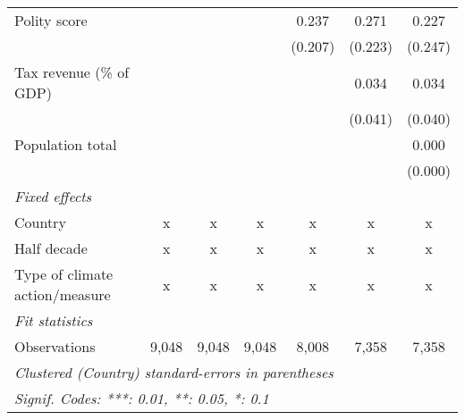 \begin{tabular}{lcccccc}
   Polity score                                                           &         &         &               & 0.237         & 0.271         & 0.227\\   
                                                                          &         &         &               & (0.207)       & (0.223)       & (0.247)\\   
   Tax revenue (\% of GDP)                                                &         &         &               &               & 0.034         & 0.034\\   
                                                                          &         &         &               &               & (0.041)       & (0.040)\\   
   Population total                                                       &         &         &               &               &               & 0.000\\   
                                                                          &         &         &               &               &               & (0.000)\\   
   \emph{Fixed effects}\\
   Country                                                                & x       & x       & x             & x             & x             & x\\  
   Half decade                                                            & x       & x       & x             & x             & x             & x\\  
   Type of climate action/measure                                         & x       & x       & x             & x             & x             & x\\  
   \midrule \emph{Fit statistics}\\
   Observations                                                           & 9,048   & 9,048   & 9,048         & 8,008         & 7,358         & 7,358\\  
   \midrule
   \multicolumn{7}{l}{\emph{Clustered (Country) standard-errors in parentheses}}\\
   \multicolumn{7}{l}{\emph{Signif. Codes: ***: 0.01, **: 0.05, *: 0.1}}\\
\end{tabular}
\par\endgroup


